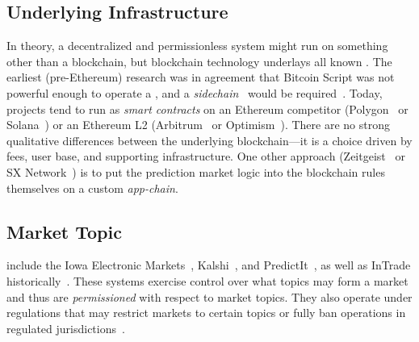 
\subsection{Underlying Infrastructure}
\label{subsec:blockchain_infra}\label{wf:chain}

In theory, a decentralized and permissionless system might run on something other than a blockchain, but blockchain technology underlays all known \depms. The earliest (pre-Ethereum) research was in agreement that Bitcoin Script was not powerful enough to operate a \depm, and a \textit{sidechain}~\cite{BCD+14} would be required~\cite{Sz14,BCFKMN14}. Today, projects tend to run as \textit{smart contracts} on an Ethereum competitor (\eg Polygon~\cite{AKN21} or Solana~\cite{Yak18}) or an Ethereum L2 (\eg Arbitrum~\cite{KGCWF18} or Optimism~\cite{op}). There are no strong qualitative differences between the underlying blockchain---it is a choice driven by fees, user base, and supporting infrastructure. One other approach (\eg Zeitgeist~\cite{zeit} or SX Network~\cite{sx}) is to put the prediction market logic into the blockchain rules themselves on a custom \textit{app-chain}.




\subsection{Market Topic}\label{wf:topic}



\cepms include the Iowa Electronic Markets~\cite{iem}, Kalshi~\cite{kalshi_docs}, and PredictIt~\cite{predictit_faq}, as well as InTrade historically~\cite{intrade}. These systems exercise control over what topics may form a market and thus are \textit{permissioned} with respect to market topics. They also operate under regulations that may restrict markets to certain topics or fully ban operations in regulated jurisdictions~\cite{Du19,Ma24}. 

